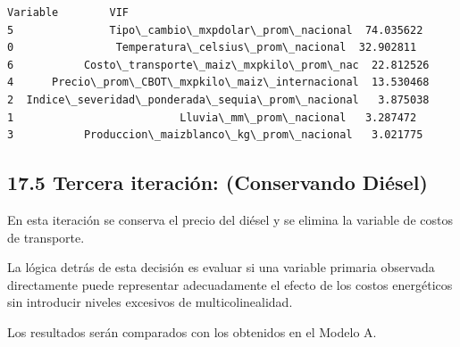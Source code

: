 \documentclass[11pt]{article}
\makeatletter
\newcommand{\boxspacing}{\kern\kvtcb@left@rule\kern\kvtcb@boxsep}
\newcommand{\prompt}[4]{
        {\ttfamily\llap{{\color{#2}[#3]:\hspace{3pt}#4}}\vspace{-\baselineskip}}
    }
\makeatother
\begin{document}
            \begin{tcolorbox}[breakable, size=fbox, boxrule=.5pt, pad at break*=1mm, opacityfill=0]
\prompt{Out}{outcolor}{41}{\boxspacing}
\begin{Verbatim}[commandchars=\\\{\}]
                                          Variable        VIF
5               Tipo\_cambio\_mxpdolar\_prom\_nacional  74.035622
0                Temperatura\_celsius\_prom\_nacional  32.902811
6           Costo\_transporte\_maiz\_mxpkilo\_prom\_nac  22.812526
4      Precio\_prom\_CBOT\_mxpkilo\_maiz\_internacional  13.530468
2  Indice\_severidad\_ponderada\_sequia\_prom\_nacional   3.875038
1                          Lluvia\_mm\_prom\_nacional   3.287472
3           Produccion\_maizblanco\_kg\_prom\_nacional   3.021775
\end{Verbatim}
\end{tcolorbox}
        
    \hypertarget{tercera-iteraciuxf3n-conservando-diuxe9sel}{%
\subsection{17.5 Tercera iteración: (Conservando
Diésel)}\label{tercera-iteraciuxf3n-conservando-diuxe9sel}}

En esta iteración se conserva el precio del diésel y se elimina la
variable de costos de transporte.

La lógica detrás de esta decisión es evaluar si una variable primaria
observada directamente puede representar adecuadamente el efecto de los
costos energéticos sin introducir niveles excesivos de
multicolinealidad.

Los resultados serán comparados con los obtenidos en el Modelo A.
\end{document}
